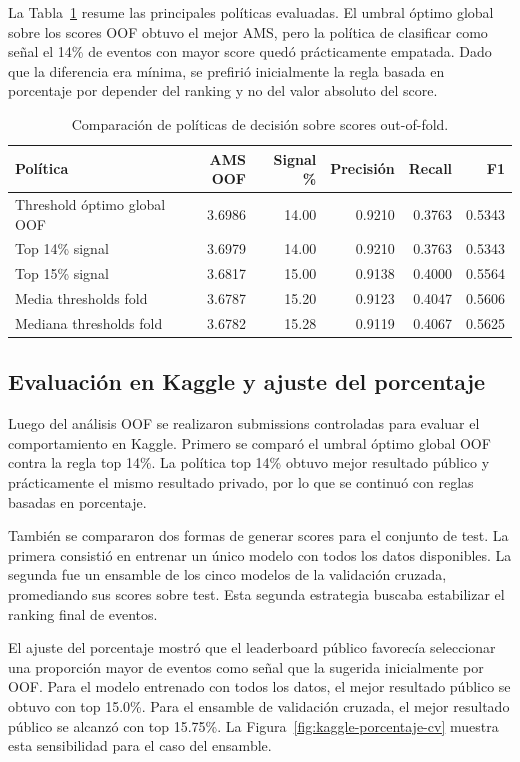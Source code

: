 \documentclass{article}
\begin{document}
La Tabla~\ref{tab:politicas-oof} resume las principales políticas evaluadas. El umbral óptimo global sobre los scores OOF obtuvo el mejor AMS, pero la política de clasificar como señal el 14\% de eventos con mayor score quedó prácticamente empatada. Dado que la diferencia era mínima, se prefirió inicialmente la regla basada en porcentaje por depender del ranking y no del valor absoluto del score.

\begin{table}[H]
    \centering
    \small
    \begin{tabular}{@{}p{} r r r r r@{}}
        \toprule
        Política & AMS OOF & Signal \% & Precisión & Recall & F1 \\
        \midrule
        Threshold óptimo global OOF & 3.6986 & 14.00 & 0.9210 & 0.3763 & 0.5343 \\
        Top 14\% signal & 3.6979 & 14.00 & 0.9210 & 0.3763 & 0.5343 \\
        Top 15\% signal & 3.6817 & 15.00 & 0.9138 & 0.4000 & 0.5564 \\
        Media thresholds fold & 3.6787 & 15.20 & 0.9123 & 0.4047 & 0.5606 \\
        Mediana thresholds fold & 3.6782 & 15.28 & 0.9119 & 0.4067 & 0.5625 \\
        \bottomrule
    \end{tabular}
    \caption{Comparación de políticas de decisión sobre scores out-of-fold.}
    \label{tab:politicas-oof}
\end{table}

\subsection{Evaluación en Kaggle y ajuste del porcentaje}
Luego del análisis OOF se realizaron submissions controladas para evaluar el comportamiento en Kaggle. Primero se comparó el umbral óptimo global OOF contra la regla top 14\%. La política top 14\% obtuvo mejor resultado público y prácticamente el mismo resultado privado, por lo que se continuó con reglas basadas en porcentaje.

También se compararon dos formas de generar scores para el conjunto de test. La primera consistió en entrenar un único modelo con todos los datos disponibles. La segunda fue un ensamble de los cinco modelos de la validación cruzada, promediando sus scores sobre test. Esta segunda estrategia buscaba estabilizar el ranking final de eventos.

El ajuste del porcentaje mostró que el leaderboard público favorecía seleccionar una proporción mayor de eventos como señal que la sugerida inicialmente por OOF. Para el modelo entrenado con todos los datos, el mejor resultado público se obtuvo con top 15.0\%. Para el ensamble de validación cruzada, el mejor resultado público se alcanzó con top 15.75\%. La Figura~\ref{fig:kaggle-porcentaje-cv} muestra esta sensibilidad para el caso del ensamble.
\end{document}

